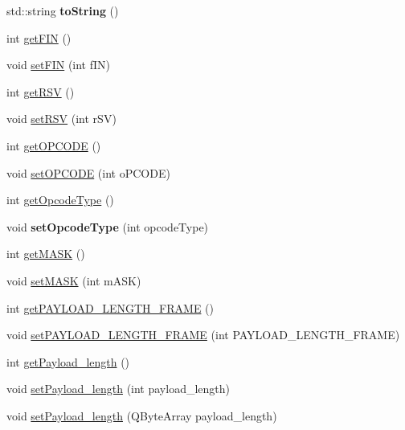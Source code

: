 \begin{DoxyCompactItemize}
\item 
\hypertarget{class_web_socket_message_af2db21702668f248d952666498a808ae}{std\-::string {\bfseries to\-String} ()}\label{class_web_socket_message_af2db21702668f248d952666498a808ae}

\item 
int \hyperlink{class_web_socket_message_a1ea8659884b107b9f718fe4c10acdd23}{get\-F\-I\-N} ()
\item 
void \hyperlink{class_web_socket_message_abfca2c154c7a4d7e79557501ee109770}{set\-F\-I\-N} (int f\-I\-N)
\item 
int \hyperlink{class_web_socket_message_a99bf7711de5832324588c8647267a3f5}{get\-R\-S\-V} ()
\item 
void \hyperlink{class_web_socket_message_a35d0874974d06a305adce10cfed64f0e}{set\-R\-S\-V} (int r\-S\-V)
\item 
int \hyperlink{class_web_socket_message_adb31f0f68158518b11067cee488e9588}{get\-O\-P\-C\-O\-D\-E} ()
\item 
void \hyperlink{class_web_socket_message_a9517ba4f7b8834a35f6af08baae3163a}{set\-O\-P\-C\-O\-D\-E} (int o\-P\-C\-O\-D\-E)
\item 
int \hyperlink{class_web_socket_message_a525d0ca0584591009826bb572fdc2bb9}{get\-Opcode\-Type} ()
\item 
\hypertarget{class_web_socket_message_a991b3a0716aef119a41f434892ae4d62}{void {\bfseries set\-Opcode\-Type} (int opcode\-Type)}\label{class_web_socket_message_a991b3a0716aef119a41f434892ae4d62}

\item 
int \hyperlink{class_web_socket_message_a5a195e4214714da35675241e53adf4b1}{get\-M\-A\-S\-K} ()
\item 
void \hyperlink{class_web_socket_message_a86665cec5c41a40e69cb9c9ff410e55c}{set\-M\-A\-S\-K} (int m\-A\-S\-K)
\item 
int \hyperlink{class_web_socket_message_a11526a5b971c4e03f68d559dab24abce}{get\-P\-A\-Y\-L\-O\-A\-D\-\_\-\-L\-E\-N\-G\-T\-H\-\_\-\-F\-R\-A\-M\-E} ()
\item 
void \hyperlink{class_web_socket_message_ad1c1498aef9222738d226167c09aa720}{set\-P\-A\-Y\-L\-O\-A\-D\-\_\-\-L\-E\-N\-G\-T\-H\-\_\-\-F\-R\-A\-M\-E} (int P\-A\-Y\-L\-O\-A\-D\-\_\-\-L\-E\-N\-G\-T\-H\-\_\-\-F\-R\-A\-M\-E)
\item 
int \hyperlink{class_web_socket_message_af59f5ae1d0f90c445cfb5eaacaa81c54}{get\-Payload\-\_\-length} ()
\item 
void \hyperlink{class_web_socket_message_ab92f2e6a5d18d13e418a55d6d00b6e4e}{set\-Payload\-\_\-length} (int payload\-\_\-length)
\item 
void \hyperlink{class_web_socket_message_a012f75a8ae98d53134c9d69a636a1852}{set\-Payload\-\_\-length} (Q\-Byte\-Array payload\-\_\-length)
\end{DoxyCompactItemize}
